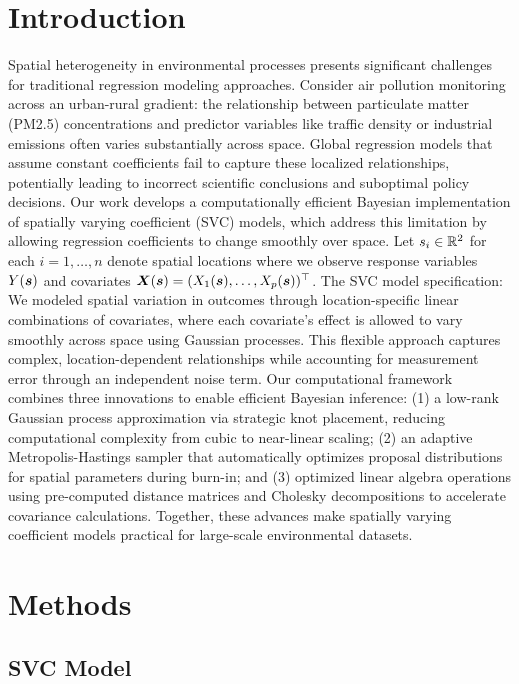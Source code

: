 \section{Introduction}
\label{sec:intro}
Spatial heterogeneity in environmental processes presents significant challenges for traditional regression modeling approaches. Consider air pollution monitoring across an urban-rural gradient: the relationship between particulate matter (PM2.5) concentrations and predictor variables like traffic density or industrial emissions often varies substantially across space. Global regression models that assume constant coefficients fail to capture these localized relationships, potentially leading to incorrect scientific conclusions and suboptimal policy decisions.
Our work develops a computationally efficient Bayesian implementation of spatially varying coefficient (SVC) models, which address this limitation by allowing regression coefficients to change smoothly over space. Let $s_i \in \mathbb{R}^2$ for each $i = 1, \dots, n$ denote spatial locations where we observe response variables $Y(\boldsymbol{s})$ and covariates $\boldsymbol{X}(\boldsymbol{s}) = (X_1(\boldsymbol{s}), \dots, X_p(\boldsymbol{s}))^\top$. The SVC model specification:
We modeled spatial variation in outcomes through location-specific linear combinations of covariates, where each covariate's effect is allowed to vary smoothly across space using Gaussian processes. 
This flexible approach captures complex, location-dependent relationships while accounting for measurement error through an independent noise term. Our computational framework combines three innovations to enable efficient Bayesian inference: 
(1) a low-rank Gaussian process approximation via strategic knot placement, reducing computational complexity from cubic to near-linear scaling; 
(2) an adaptive Metropolis-Hastings sampler that automatically optimizes proposal distributions for spatial parameters during burn-in; and
(3) optimized linear algebra operations using pre-computed distance matrices and Cholesky decompositions to accelerate covariance calculations. 
Together, these advances make spatially varying coefficient models practical for large-scale environmental datasets.
\section{Methods}
\label{sec:methods}

\subsection{SVC Model}
\label{sec:model}

